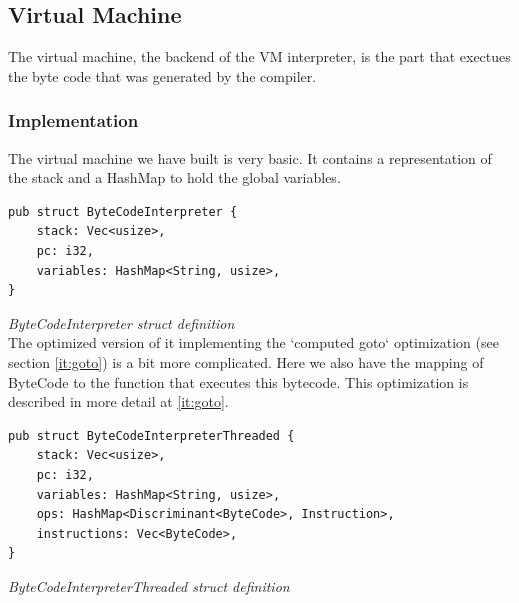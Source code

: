 \documentclass{article}
\begin{document}

\subsection{Virtual Machine}
The virtual machine, the backend of the VM interpreter, is the part that
exectues the byte code that was generated by the compiler.

\subsubsection{Implementation}
The virtual machine we have built is very basic. It contains a representation
of the stack and a HashMap to hold the global variables.

\begin{verbatim}
pub struct ByteCodeInterpreter {
    stack: Vec<usize>,
    pc: i32,
    variables: HashMap<String, usize>,
}
\end{verbatim}
\textit{ByteCodeInterpreter struct definition} \\

The optimized version of it implementing the `computed goto` optimization (see
section \ref{it:goto}) is a bit more complicated. Here we also have the mapping
of ByteCode to the function that executes this bytecode. This optimization is 
described in more detail at \ref{it:goto}.

\begin{verbatim}
pub struct ByteCodeInterpreterThreaded {
    stack: Vec<usize>,
    pc: i32,
    variables: HashMap<String, usize>,
    ops: HashMap<Discriminant<ByteCode>, Instruction>,
    instructions: Vec<ByteCode>,
}
\end{verbatim}
\textit{ByteCodeInterpreterThreaded struct definition} \\
\end{document}
